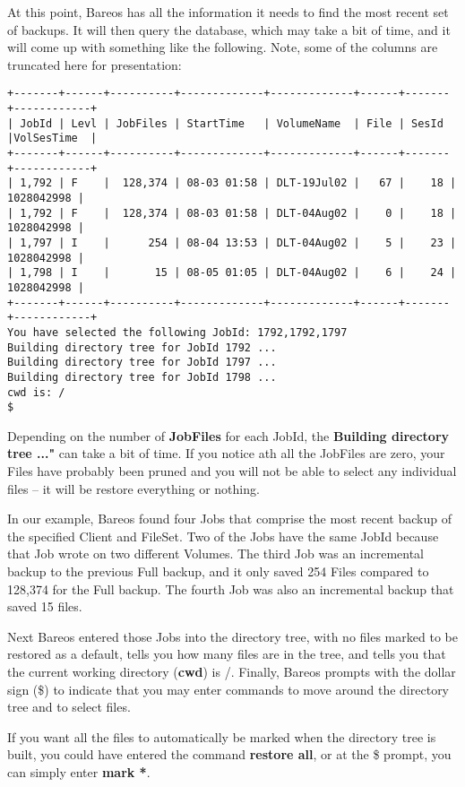 At this point, Bareos has all the information it needs to find the most
recent set of backups. It will then query the database, which may take a bit
of time, and it will come up with something like the following. Note, some of
the columns are truncated here for presentation:

\footnotesize
\begin{verbatim}
+-------+------+----------+-------------+-------------+------+-------+------------+
| JobId | Levl | JobFiles | StartTime   | VolumeName  | File | SesId |VolSesTime  |
+-------+------+----------+-------------+-------------+------+-------+------------+
| 1,792 | F    |  128,374 | 08-03 01:58 | DLT-19Jul02 |   67 |    18 | 1028042998 |
| 1,792 | F    |  128,374 | 08-03 01:58 | DLT-04Aug02 |    0 |    18 | 1028042998 |
| 1,797 | I    |      254 | 08-04 13:53 | DLT-04Aug02 |    5 |    23 | 1028042998 |
| 1,798 | I    |       15 | 08-05 01:05 | DLT-04Aug02 |    6 |    24 | 1028042998 |
+-------+------+----------+-------------+-------------+------+-------+------------+
You have selected the following JobId: 1792,1792,1797
Building directory tree for JobId 1792 ...
Building directory tree for JobId 1797 ...
Building directory tree for JobId 1798 ...
cwd is: /
$
\end{verbatim}
\normalsize

Depending on the number of {\bf JobFiles} for each JobId, the {\bf Building
directory tree ..."} can take a bit of time. If you notice ath all the
JobFiles are zero, your Files have probably been pruned and you will not be
able to select any individual files -- it will be restore everything or
nothing.

In our example, Bareos found four Jobs that comprise the most recent backup of
the specified Client and FileSet. Two of the Jobs have the same JobId because
that Job wrote on two different Volumes. The third Job was an incremental
backup to the previous Full backup, and it only saved 254 Files compared to
128,374 for the Full backup. The fourth Job was also an incremental backup
that saved 15 files.

Next Bareos entered those Jobs into the directory tree, with no files marked
to be restored as a default, tells you how many files are in the tree, and
tells you that the current working directory ({\bf cwd}) is /. Finally, Bareos
prompts with the dollar sign (\$) to indicate that you may enter commands to
move around the directory tree and to select files.

If you want all the files to automatically be marked when the directory
tree is built, you could have entered the command {\bf restore all}, or
at the \$ prompt, you can simply enter {\bf mark *}.

